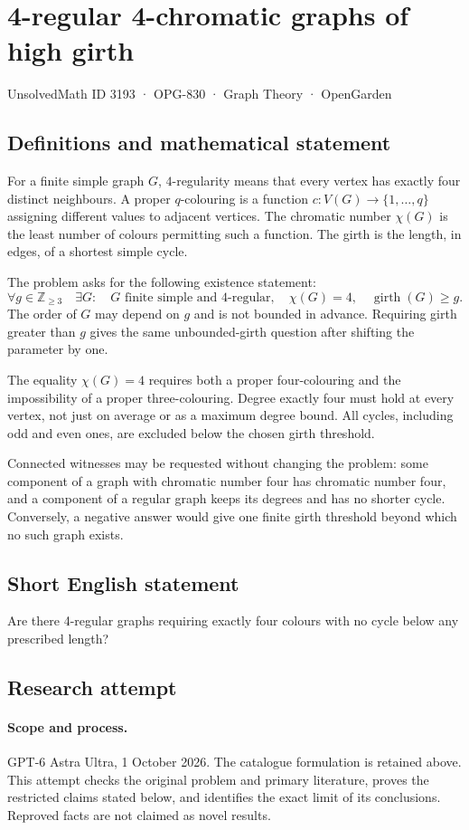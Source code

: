 \documentclass[11pt,a4paper]{article}
\begin{document}
\section*{4-regular 4-chromatic graphs of high girth}\label{3193}
{\small UnsolvedMath ID 3193 · OPG-830 · Graph Theory · OpenGarden}
\subsection{Definitions and mathematical statement}
For a finite simple graph $G$, $4$-regularity means
that every vertex has exactly four distinct neighbours.
A proper $q$-colouring is a function
$c:V(G)\to\{1,\ldots,q\}$ assigning different values
to adjacent vertices. The chromatic number $\chi(G)$
is the least number of colours permitting such a
function. The girth is the length, in edges, of a
shortest simple cycle.

The problem asks for the following existence statement:
\[
 \forall g\in\mathbb Z_{\geq3}\quad\exists G:
 \quad G\text{ finite simple and $4$-regular},\quad
 \chi(G)=4,\quad\operatorname{girth}(G)\geq g.
\]
The order of $G$ may depend on $g$ and is not bounded
in advance. Requiring girth greater than $g$ gives
the same unbounded-girth question after shifting
the parameter by one.

The equality $\chi(G)=4$ requires both a proper
four-colouring and the impossibility of a proper
three-colouring. Degree exactly four must hold at
every vertex, not just on average or as a maximum
degree bound. All cycles, including odd and even
ones, are excluded below the chosen girth threshold.

Connected witnesses may be requested without changing
the problem: some component of a graph with chromatic
number four has chromatic number four, and a component
of a regular graph keeps its degrees and has no
shorter cycle. Conversely, a negative answer would
give one finite girth threshold beyond which no
such graph exists.
\subsection{Short English statement}
Are there 4-regular graphs requiring exactly four colours with no cycle below any prescribed length?
\subsection{Research attempt}
\paragraph{Scope and process.}
GPT-6 Astra Ultra, 1 October 2026. The catalogue formulation is retained above. This attempt checks the original problem and primary literature, proves the restricted claims stated below, and identifies the exact limit of its conclusions. Reproved facts are not claimed as novel results.
\end{document}
